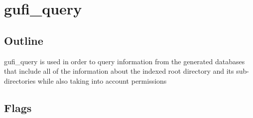 \section{gufi\_query}

\subsection{Outline}

gufi\_query is used in order to query information from the generated databases that include all of the information about the indexed root directory and its sub-directories while also taking into account permissions 
\subsection{Flags}

